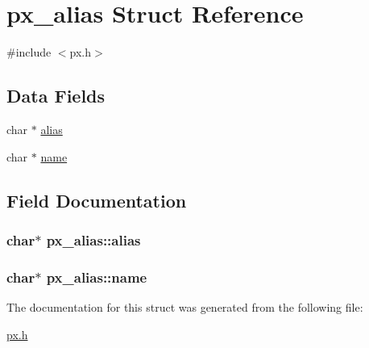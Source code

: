 \hypertarget{structpx__alias}{\section{px\-\_\-alias Struct Reference}
\label{structpx__alias}
}


{\ttfamily \#include $<$px.\-h$>$}

\subsection*{Data Fields}
\begin{DoxyCompactItemize}
\item 
char $\ast$ \hyperlink{structpx__alias_a6f18118842e0ee16f4090235a871de49}{alias}
\item 
char $\ast$ \hyperlink{structpx__alias_a92b52c073139e7dac0fc7b45478f7702}{name}
\end{DoxyCompactItemize}


\subsection{Field Documentation}
\hypertarget{structpx__alias_a6f18118842e0ee16f4090235a871de49}{
\subsubsection[{alias}]{\setlength{\rightskip}{0pt plus 5cm}char$\ast$ px\-\_\-alias\-::alias}}\label{structpx__alias_a6f18118842e0ee16f4090235a871de49}
\hypertarget{structpx__alias_a92b52c073139e7dac0fc7b45478f7702}{
\subsubsection[{name}]{\setlength{\rightskip}{0pt plus 5cm}char$\ast$ px\-\_\-alias\-::name}}\label{structpx__alias_a92b52c073139e7dac0fc7b45478f7702}


The documentation for this struct was generated from the following file\-:\begin{DoxyCompactItemize}
\item 
\hyperlink{px_8h}{px.\-h}\end{DoxyCompactItemize}
